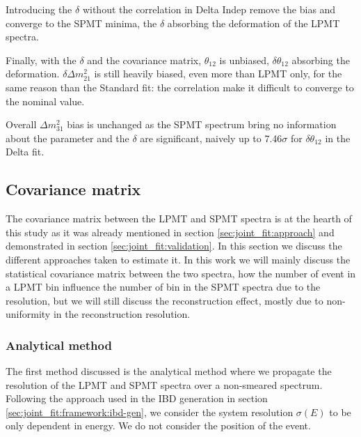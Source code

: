 \documentclass[../main.tex]{subfiles}
\begin{document}
Introducing the $\delta$ without the correlation in Delta Indep remove the bias and converge to the SPMT minima, the $\delta$ absorbing the deformation of the LPMT spectra.

Finally, with the $\delta$ and the covariance matrix, $\theta_{12}$ is unbiased, $\delta \theta_{12}$ absorbing the deformation. $\delta \Delta m^2_{21}$ is still heavily biased, even more than LPMT only, for the same reason than the Standard fit: the correlation make it difficult to converge to the nominal value.

Overall $\Delta m^2_{31}$ bias is unchanged as the SPMT spectrum bring no information about the parameter and the $\delta$ are significant, naively up to 7.46$\sigma$ for $\delta \theta_{12}$ in the Delta fit.




%
%
\subsection{Covariance matrix}
\label{sec:joint_fit:cov_mat}

The covariance matrix between the LPMT and SPMT spectra is at the hearth of this study as it was already mentioned in section \ref{sec:joint_fit:approach} and demonstrated in section \ref{sec:joint_fit:validation}. In this section we discuss the different approaches taken to estimate it. In this work we will mainly discuss the statistical covariance matrix between the two spectra, how the number of event in a LPMT bin influence the number of bin in the SPMT spectra due to the resolution, but we will still discuss the reconstruction effect, mostly due to non-uniformity in the reconstruction resolution.

\subsubsection{Analytical method}

The first method discussed is the analytical method where we propagate the resolution of the LPMT and SPMT spectra over a non-smeared spectrum. Following the approach used in the IBD generation in section \ref{sec:joint_fit:framework:ibd-gen}, we consider the system resolution $\sigma(E)$ to be only dependent in energy. We do not consider the position of the event.
\end{document}
